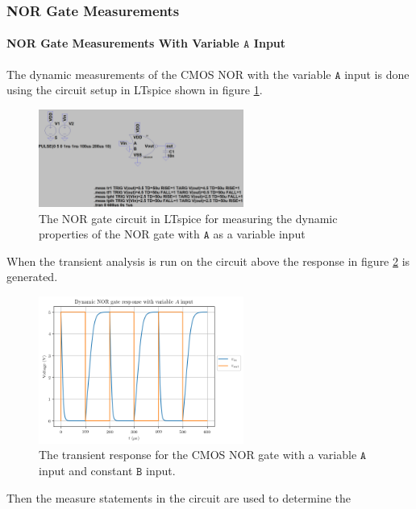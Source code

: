 \documentclass[titlepage, 12pt]{article}
\newcommand\sA{\ensuremath{\mathtt{A}}}
\newcommand\sB{\ensuremath{\mathtt{B}}}
\begin{document}
    \pagebreak
    \subsubsection{NOR Gate Measurements}
    \paragraph{NOR Gate Measurements With Variable $\mathtt{A}$
    Input}

    The dynamic measurements of the CMOS NOR with the variable $\sA$ input
    is done using the circuit setup in LTspice shown in figure
    \ref{fig:part_22_NOR_A_circuit}.
    \begin{figure}[H]
        \centering
        \includegraphics[width=0.6\textwidth]
        {figures/part_22_NOR_A_circuit.png}
        \caption{The NOR gate circuit in LTspice for measuring the
            dynamic properties of the NOR gate with $\sA$ as a variable
        input}
        \label{fig:part_22_NOR_A_circuit}
    \end{figure}
    When the transient analysis is run on the circuit above the response
    in figure \ref{fig:part_22_NOR_A} is generated.
    \begin{figure}[H]
        \centering
        \includegraphics[width=0.6\textwidth]{figures/part_22_NOR_A.png}
        \caption{The transient response for the CMOS NOR gate with a
        variable $\sA$ input and constant $\sB$ input.}
        \label{fig:part_22_NOR_A}
    \end{figure}
    Then the measure statements in the circuit are used to determine the
\end{document}

